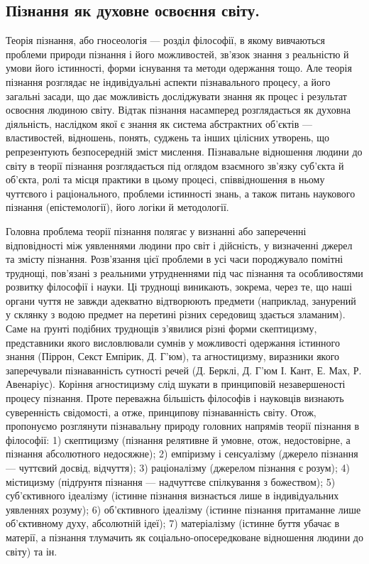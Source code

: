 \subsection{Пізнання як духовне освоєння світу.}
Теорія пізнання, або гносеологія ---
розділ філософії, в якому вивчаються проблеми природи пізнання і його
можливостей, зв’язок знання з реальністю й умови його істинності, форми
існування та методи одержання тощо. Але теорія пізнання розглядає не
індивідуальні аспекти пізнавального процесу, а його загальні засади, що дає
можливість досліджувати знання як процес і результат освоєння людиною
світу. Відтак пізнання насамперед розглядається як духовна діяльність,
наслідком якої є знання як система абстрактних об’єктів --- властивостей,
відношень, понять, суджень та інших цілісних утворень, що репрезентують
безпосередній зміст мислення. Пізнавальне відношення людини до світу в 
теорії пізнання розглядається під оглядом взаємного зв’язку суб’єкта й об’єкта,
ролі та місця практики в цьому процесі, співвідношення в ньому чуттєвого і
раціонального, проблеми істинності знань, а також питань наукового пізнання
(епістемології), його логіки й методології.

Головна проблема теорії пізнання полягає у визнанні або запереченні
відповідності між уявленнями людини про світ і дійсність, у визначенні джерел
та змісту пізнання. Розв’язання цієї проблеми в усі часи породжувало помітні
труднощі, пов’язані з реальними утрудненнями під час пізнання та
особливостями розвитку філософії і науки. Ці труднощі виникають, зокрема,
через те, що наші органи чуття не завжди адекватно відтворюють предмети
(наприклад, занурений у склянку з водою предмет на перетині різних
середовищ здається зламаним). Саме на ґрунті подібних труднощів з’явилися
різні форми скептицизму, представники якого висловлювали сумнів у
можливості одержання істинного знання (Піррон, Секст Емпірик, Д. Г’юм), та
агностицизму, виразники якого заперечували пізнаванність сутності речей
(Д. Берклі, Д. Г’юм І. Кант, Е. Мах, Р. Авенаріус). Коріння агностицизму слід
шукати в принциповій незавершеності процесу пізнання. Проте переважна
більшість філософів і науковців визнають суверенність свідомості, а отже,
принципову пізнаванність світу. Отож, пропонуємо розглянути пізнавальну
природу головних напрямів теорії пізнання в філософії: 1) скептицизму
(пізнання релятивне й умовне, отож, недостовірне, а пізнання абсолютного
недосяжне); 2) емпіризму і сенсуалізму (джерело пізнання --- чуттєвий досвід,
відчуття); 3) раціоналізму (джерелом пізнання є розум); 4) містицизму
(підґрунтя пізнання --- надчуттєве спілкування з божеством); 5) суб’єктивного
ідеалізму (істинне пізнання визнається лише в індивідуальних уявленнях
розуму); 6) об’єктивного ідеалізму (істинне пізнання притаманне лише
об’єктивному духу, абсолютній ідеї); 7) матеріалізму (істинне буття убачає в
матерії, а пізнання тлумачить як соціально-опосередковане відношення людини
до світу) та ін.

